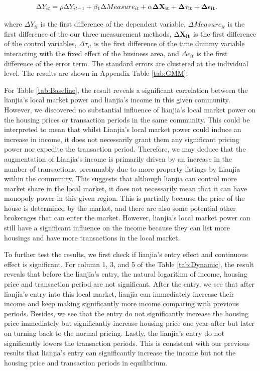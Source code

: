 \begin{equation}
  \begin{aligned}
    \Delta Y_{it} & = \rho \Delta Y_{it-1} + \beta_1 \Delta Measure_{it} + \bf{\alpha} \Delta \bf{X}_{it} + \Delta \tau_{it} + \Delta \epsilon_{it}.
  \end{aligned}
\end{equation}

where $\Delta Y_{it}$ is the first difference of the dependent variable, $\Delta Measure_{it}$ is the first difference of the our three measurement methods, $\Delta \bf{X}_{it}$ is the first difference of the control variables, $\Delta \tau_{it}$ is the first difference of the time dummy variable interacting with the fixed effect of the business area, and $\Delta \epsilon_{it}$ is the first difference of the error term. The standard errors are clustered at the individual level. The results are shown in Appendix Table \ref{tab:GMM}.


For Table \ref{tab:Baseline}, the result reveals a significant correlation between the lianjia's local market power and lianjia's income in this given community. However, we discovered no substantial influence of lianjia's local market power on the housing prices or transaction periods in the same community. This could be interpreted to mean that whilst Lianjia's local market power could induce an increase in income, it does not necessarily grant them any significant pricing power nor expedite the transaction period. Therefore, we may deduce that the augmentation of Lianjia's income is primarily driven by an increase in the number of transactions, presumably due to more property listings by Lianjia within the community. This suggests that although lianjia can control more market share in the local market, it does not necessarily mean that it can have monopoly power in this given region. This is partially because the price of the house is determined by the market, and there are also some potential other brokerages that can enter the market. However, lianjia's local market power can still have a significant influence on the income because they can list more housings and have more transactions in the local market.

To further test the results, we first check if lianjia's entry effect and continuous effect is significant. For column 1, 3, and 5 of the Table \ref{tab:Dynamic}, the result reveals that before the lianjia's entry, the natural logarithm of income, housing price and transaction period are not significant. After the entry, we see that after lianjia's entry into this local market, lianjia can immediately increase their income and keep making significantly more income comparing with previous periods. Besides, we see that the entry do not significantly increase the housing price immediately but significantly increase housing price one year after but later on turning back to the normal pricing. Lastly, the lianjia's entry do not significantly lowers the transaction periods. This is consistent with our previous results that lianjia's entry can significantly increase the income but not the housing price and transaction periods in equilibrium.

